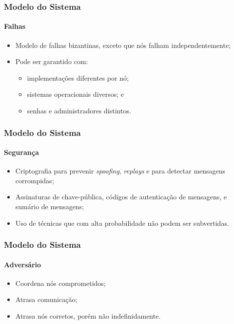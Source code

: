 \documentclass{beamer}
\begin{document}
\begin{frame}
  \frametitle{Modelo do Sistema}
  \framesubtitle{Falhas}

  \begin{itemize}
    \item
      Modelo de falhas bizantinas, exceto que nós falham independentemente;

    \item
      Pode ser garantido com:
      \begin{itemize}
        \item
          implementações diferentes por nó;

        \item
          sistemas operacionais diversos; e

        \item
          senhas e administradores distintos.
      \end{itemize}
  \end{itemize}
\end{frame}

\begin{frame}
  \frametitle{Modelo do Sistema}
  \framesubtitle{Segurança}

  \begin{itemize}
    \item
      Criptografia para prevenir \textit{spoofing}, \textit{replays} e para detectar mensagens corrompidas;

    \item
      Assinaturas de chave-pública, códigos de autenticação de mensagens, e sumário de mensagens;

    \item
      Uso de técnicas que com alta probabilidade não podem ser subvertidas.
  \end{itemize}
\end{frame}

\begin{frame}
  \frametitle{Modelo do Sistema}
  \framesubtitle{Adversário}

  \begin{itemize}
      \item
        Coordena nós comprometidos;

      \item
        Atrasa comunicação;

      \item
        Atrasa nós corretos, porém não indefinidamente.
  \end{itemize}
\end{frame}
\end{document}
